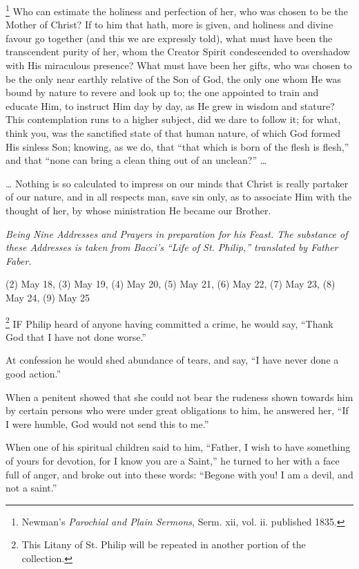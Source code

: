 \footnote{Newman's \emph{Parochial and Plain Sermons}, Serm. xii, vol. ii.
published 1835.} Who can estimate the holiness and perfection of her, who was
chosen to be the Mother of Christ? If to him that hath, more is given,
and holiness and divine favour go together (and this we are expressly
told), what must have been the transcendent purity of her, whom the
Creator Spirit condescended to overshadow with His miraculous presence?
What must have been her gifts, who was chosen to be the only near
earthly relative of the Son of God, the only one whom He was bound by
nature to revere and look up to; the one appointed to train and educate
Him, to instruct Him day by day, as He grew in wisdom and stature? This
contemplation runs to a higher subject, did we dare to follow it; for
what, think you, was the sanctified state of that human nature, of which
God formed His sinless Son; knowing, as we do, that ``that which is born
of the flesh is flesh,'' and that ``none can bring a clean thing out of an
unclean?'' …

… Nothing is so calculated to
impress on our minds that Christ is really partaker of our nature, and
in all respects man, save sin only, as to associate Him with the thought
of her, by whose ministration He became our Brother.


\emph{Being Nine
Addresses and Prayers in preparation for his Feast. The substance of
these Addresses is taken from Bacci's ``Life of St. Philip,'' translated
by Father Faber.}

(2) May 18, (3) May 19, (4)
May 20, (5) May 21, (6) May
22, (7) May 23, (8) May 24,
(9) May 25


\footnote{This Litany of St. Philip will be repeated in another portion of the
collection.} IF
Philip heard of anyone having committed a crime, he would say, ``Thank
God that I have not done worse.''

At confession he would shed
abundance of tears, and say, ``I have never done a good action.''

When a penitent showed that she
could not bear the rudeness shown towards him by certain persons who
were under great obligations to him, he answered her, ``If I were humble,
God would not send this to me.''

When one of his spiritual
children said to him, ``Father, I wish to have something of yours for
devotion, for I know you are a Saint,'' he turned to her with a face full
of anger, and broke out into these words: ``Begone with you! I am a
devil, and not a saint.''

